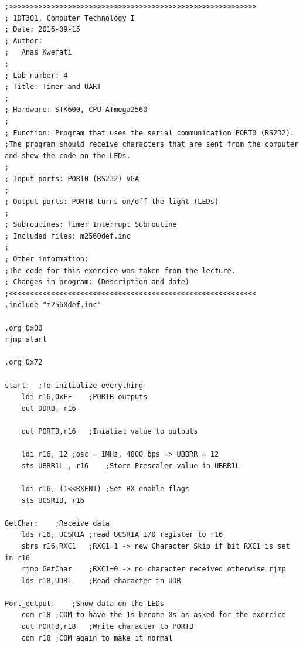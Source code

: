 \documentclass[a4paper,12pt]{article}
\begin{document}
\begin{lstlisting}
;>>>>>>>>>>>>>>>>>>>>>>>>>>>>>>>>>>>>>>>>>>>>>>>>>>>>>>>>>>>
; 1DT301, Computer Technology I
; Date: 2016-09-15
; Author:
;	Anas Kwefati
;
; Lab number: 4
; Title: Timer and UART
;
; Hardware: STK600, CPU ATmega2560
;
; Function: Program that uses the serial communication PORT0 (RS232).
;The program should receive characters that are sent from the computer and show the code on the LEDs.
;
; Input ports: PORT0 (RS232) VGA
;
; Output ports: PORTB turns on/off the light (LEDs)
;
; Subroutines: Timer Interrupt Subroutine
; Included files: m2560def.inc
;
; Other information:
;The code for this exercice was taken from the lecture.
; Changes in program: (Description and date)
;<<<<<<<<<<<<<<<<<<<<<<<<<<<<<<<<<<<<<<<<<<<<<<<<<<<<<<<<<<<
.include "m2560def.inc"

.org 0x00
rjmp start

.org 0x72

start:	;To initialize everything
	ldi r16,0xFF	;PORTB outputs
	out DDRB, r16

	out PORTB,r16	;Iniatial value to outputs

	ldi r16, 12	;osc = 1MHz, 4800 bps => UBBRR = 12
	sts UBRR1L , r16	;Store Prescaler value in UBRR1L

	ldi r16, (1<<RXEN1)	;Set RX enable flags
	sts UCSR1B, r16

GetChar:	;Receive data
	lds r16, UCSR1A	;read UCSR1A I/0 register to r16
	sbrs r16,RXC1	;RXC1=1 -> new Character Skip if bit RXC1 is set in r16
	rjmp GetChar	;RXC1=0 -> no character received otherwise rjmp
	lds r18,UDR1	;Read character in UDR

Port_output:	;Show data on the LEDs
	com r18	;COM to have the 1s become 0s as asked for the exercice
	out PORTB,r18	;Write character to PORTB
	com r18	;COM again to make it normal

\end{lstlisting}
\end{document}
